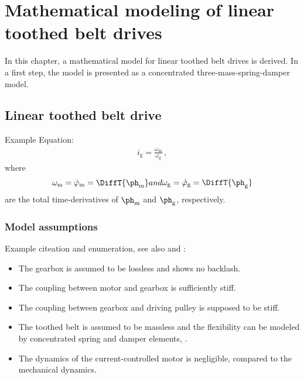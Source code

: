 \chapter[Mathematical modeling]{Mathematical modeling of linear toothed belt drives}
\label{cha:model}
In this chapter, a mathematical model for linear toothed belt drives is derived. In a first step, the model is presented as a concentrated three-mass-spring-damper model. 
\section{Linear toothed belt drive}
\label{sec:belt_assumptions}
Example Equation:
\begin{align}
i_\text{g}=\frac{\omega_\text{m}}{\omega_\text{g}}\,,
\label{eq:Transmission}
\end{align}	
where
\begin{subequations}
	\begin{align}
	\omega_\text{m}=\dot{\varphi}_\text{m}=\DiffT{\ph_\text{m}}
	\label{eq:diff_phim}
	\end{align}
	and
	\begin{align}
	\omega_\text{g}=\dot{\varphi}_\text{g}=\DiffT{\ph_\text{g}}
	\end{align}	
\end{subequations}
are the total time-derivatives of $\ph_\text{m}$ and $\ph_\text{g}$, respectively. 

\subsection{Model assumptions}
Example citeation and enumeration, see also \cite{Jezernik2007,Jokinen2008,Ellis2001} and \cite[190ff]{Gurocak2015}:
\begin{itemize}
	\item The gearbox is assumed to be lossless and shows no backlash.
	\item The coupling between motor and gearbox is sufficiently stiff.
	\item The coupling between gearbox and driving pulley is supposed to be stiff.
	\item The toothed belt is assumed to be massless and the flexibility can be modeled by concentrated spring and damper elements, \cf {}.
	\item The dynamics of the current-controlled motor is negligible, compared to the mechanical dynamics. 
\end{itemize} 

